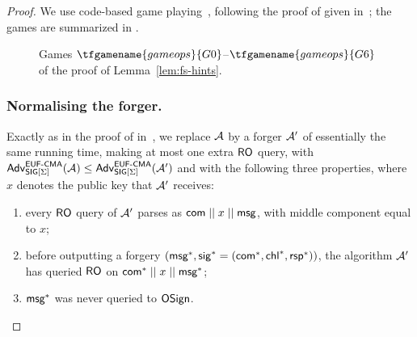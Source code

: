 \begin{proof}
    We use code-based game playing~\cite{EC:BelRog06}, following the proof of  given in~\cite{EC:AABN02}; 
    the games are summarized in .
    \begin{figure}
        \centering 
        \caption{Games $\tfgamename{gameops}{G0}$--$\tfgamename{gameops}{G6}$ of the proof of Lemma~\ref{lem:fs-hints}.}
        \label{fig:games}
    \end{figure}

\subsubsection*{Normalising the forger.}
Exactly as in the proof of  in~\cite{EC:AABN02}, we replace $\mathcal{A}$
by a forger $\mathcal{A}'$ of essentially the same running time, making at most one
extra $\mathsf{RO}$ query, with
$\mathsf{Adv}^{\mathsf{EUF}\text{-}\mathsf{CMA}}_{\mathsf{SIG}[\Sigma]}(\mathcal{A}) \leq
\mathsf{Adv}^{\mathsf{EUF}\text{-}\mathsf{CMA}}_{\mathsf{SIG}[\Sigma]}(\mathcal{A}')$ and with the following three
properties, where $x$ denotes the public key that $\mathcal{A}'$ receives:
\begin{enumerate}[label=(\roman*)]
    \item every $\mathsf{RO}$ query of $\mathcal{A}'$ parses as $\mathsf{com} \mathrel{||} x \mathrel{||}
        \textsf{msg}$, with middle component equal to $x$;
    \item before outputting a forgery $(\textsf{msg}^*, \mathsf{sig}^* = (\mathsf{com}^*, \mathsf{chl}^*,
        \mathsf{rsp}^*))$, the algorithm $\mathcal{A}'$ has queried $\mathsf{RO}$ on $\mathsf{com}^* \mathrel{||}
        x \mathrel{||} \textsf{msg}^*$;
    \item $\textsf{msg}^*$ was never queried to $\mathsf{OSign}$.
\end{enumerate}


\end{proof}
